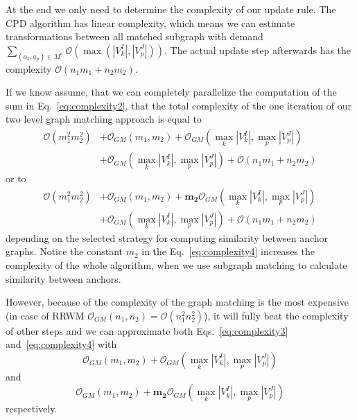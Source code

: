 At the end we only need to determine the complexity of our update rule. The CPD algorithm has linear complexity, which means we can estimate transformations between all matched subgraph with demand $\sum_{(a_k,a_p)\in M^a}\mathcal{O}(\max(|V^I_k|,|V^J_p|))$. The actual update step afterwards has the complexity $\mathcal{O}(n_1m_1+n_2m_2)$.

If we know assume, that we can completely parallelize the computation of the sum in Eq.~\eqref{eq:complexity2}, that the total complexity of the one iteration of our two level graph matching approach is equal to
\begin{equation}\label{eq:complexity3}
\begin{split}
\mathcal{O}(m_1^2m_2^2)&+\mathcal{O}_{GM}(m_1,m_2)+\mathcal{O}_{GM}(\max_{k}|V^I_k|,\max_{p}|V^J_p|)\\
                       &+\mathcal{O}_{GM}(\max_{k}|V^I_k|,\max_{p}|V^J_p|)+\mathcal{O}(n_1m_1+n_2m_2)
\end{split}
\end{equation}
or to
\begin{equation}\label{eq:complexity4}
\begin{split}
\mathcal{O}(m_1^2m_2^2)&+\mathcal{O}_{GM}(m_1,m_2)+\mathbf{m_2}\mathcal{O}_{GM}(\max_{k}|V^I_k|,\max_{p}|V^J_p|)\\
&+\mathcal{O}_{GM}(\max_{k}|V^I_k|,\max_{p}|V^J_p|)+\mathcal{O}(n_1m_1+n_2m_2)
\end{split}
\end{equation}
depending on the selected strategy for computing similarity between anchor graphs. Notice the constant $m_2$ in the Eq.~\eqref{eq:complexity4} increases the complexity of the whole algorithm, when we use subgraph matching to calculate similarity between anchors.

However, because of the complexity of the graph matching is the most expensive (in case of RRWM $\mathcal{O}_{GM}(n_1,n_2)=\mathcal{O}(n_1^2n_2^2)$), it will fully beat the complexity of other steps and we can approximate both Eqs.~\eqref{eq:complexity3} and~\eqref{eq:complexity4} with
\begin{equation}\label{eq:complexity3.1}
\mathcal{O}_{GM}(m_1,m_2)+\mathcal{O}_{GM}(\max_{k}|V^I_k|,\max_{p}|V^J_p|)
\end{equation} 
and 
\begin{equation}\label{eq:complexity4.1}
\mathcal{O}_{GM}(m_1,m_2)+\mathbf{m_2}\mathcal{O}_{GM}(\max_{k}|V^I_k|,\max_{p}|V^J_p|)
\end{equation}
respectively.

